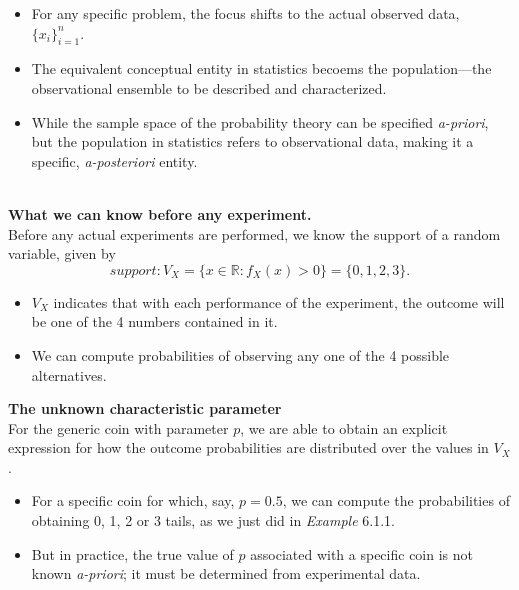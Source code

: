 \documentclass[twoside]{article}
\makeatletter
\theoremstyle{definition}
\theoremstyle{remark}
\theoremstyle{remark}
\newenvironment{example}
 {\patchcmd{\@thm}{\trivlist}{\list{}{\leftmargin=3em \rightmargin=3em}}{}{}%
  \vspace*{10\p@}
  \innerexample\pushQED{\hfill\ensuremath{\Diamond}}}
 {\popQED\endinnerexample}
\makeatother
\begin{document}
\begin{itemize}
  \item For any specific problem, the focus shifts to the actual observed data,
  $\{x_i\}_{i=1}^{n}$.
  \item The equivalent conceptual entity in statistics becoems the population---the
  observational ensemble to be described and characterized.
  \item While the sample space of the probability theory can be specified
  \textit{a-priori}, but the population in statistics refers to observational
  data, making it a specific, \textit{a-posteriori} entity.
\end{itemize}

\begin{example}{3 coin tossing revisit} \\
  \textbf{What we can know before any experiment.}\\
  Before any actual experiments are performed, we know the support of a random
  variable, given by
  \begin{equation*}
    \textit{support}: V_X = \{ x \in \mathbb{R} : f_X(x) > 0 \} = \{0, 1, 2, 3\}.
  \end{equation*}
  \begin{itemize}
    \item $V_X$ indicates that with each performance of the experiment, the
    outcome will be one of the 4 numbers contained in it.
    \item We can compute probabilities of observing any one of the 4 possible
    alternatives.
  \end{itemize}

  \textbf{The unknown characteristic parameter}\\
  For the generic coin with parameter $p$, we are able to obtain an
  explicit expression for how the outcome probabilities are distributed over
  the values in $V_X$.
  \begin{itemize}
    \item For a specific coin for which, say, $p = 0.5$, we can compute the
    probabilities of obtaining 0, 1, 2 or 3 tails, as we just did in
    \textit{Example} 6.1.1.
    \item But in practice, the true value of $p$ associated with a specific
    coin is not known \textit{a-priori}; it must be determined from experimental
    data.
  \end{itemize}


\end{example}
\end{document}
